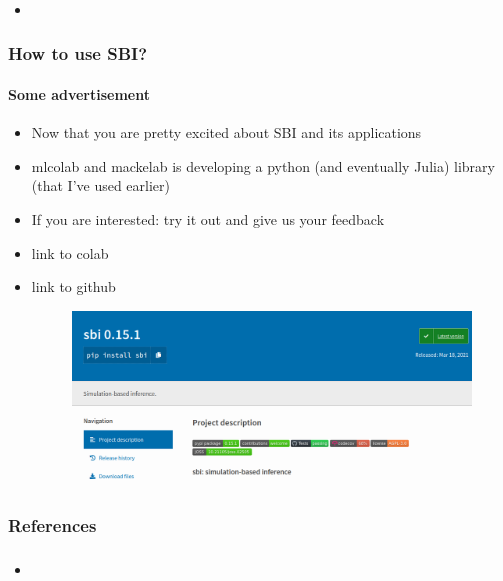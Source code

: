 \documentclass[9pt]{beamer}
\begin{document}
\begin{frame}
\frametitle{}
\framesubtitle{}
\begin{itemize}
	\item 
\end{itemize}
\end{frame} 


\begin{frame}
\frametitle{How to use SBI?}
\framesubtitle{Some advertisement}
\begin{itemize}
	\item Now that you are pretty excited about SBI and its applications
	\item mlcolab and mackelab is developing a python (and eventually Julia) library (that I've used earlier)
	\item If you are interested: try it out and give us your feedback
	\item link to colab
	\item link to github
		\begin{figure}
		\flushleft
		\includegraphics[width=.75\linewidth]{figures/sbipypi.png}
	\end{figure}
\end{itemize}
\end{frame} 


\begin{frame}
\frametitle{References}
\framesubtitle{}

\end{frame} 




\begin{frame}
\frametitle{}
\framesubtitle{}
\begin{itemize}
	\item 
\end{itemize}
\end{frame} 
\end{document}
